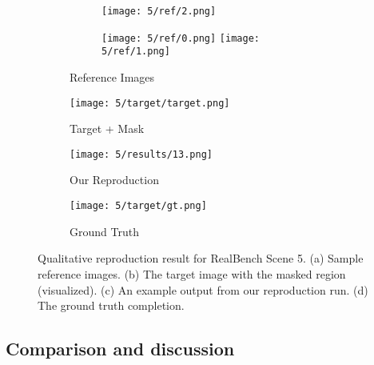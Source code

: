 \documentclass{article}
\begin{document}
\begin{figure}[H] %
    \centering
    \begin{subfigure}[b]{0.26\linewidth}
        \centering
        \begin{subfigure}[b]{0.55\linewidth}
            \texttt{[image: 5/ref/2.png]}
        \end{subfigure}
        \begin{subfigure}[b]{0.4\linewidth}
            \texttt{[image: 5/ref/0.png]}
            \texttt{[image: 5/ref/1.png]}
        \end{subfigure}
        \caption{Reference Images}
    \end{subfigure}
    \hfill %
    \begin{subfigure}[b]{0.24\linewidth}
        \centering
        \texttt{[image: 5/target/target.png]}
        \caption{Target + Mask}
    \end{subfigure}
    \hfill
    \begin{subfigure}[b]{0.24\linewidth}
        \centering
        \texttt{[image: 5/results/13.png]}
        \caption{Our Reproduction}
    \end{subfigure}
    \hfill
    \begin{subfigure}[b]{0.24\linewidth}
        \centering
        \texttt{[image: 5/target/gt.png]}
        \caption{Ground Truth}
    \end{subfigure}
    \caption{Qualitative reproduction result for RealBench Scene 5. (a) Sample reference images. (b) The target image with the masked region (visualized). (c) An example output from our reproduction run. (d) The ground truth completion.}
    \label{fig:reproduced_qualitative_example}
\end{figure}

\subsection{Comparison and discussion}
\label{subsec:comparison_and_discussion}
\end{document}
